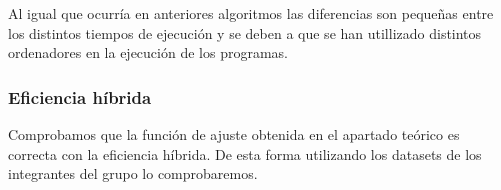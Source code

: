 \documentclass[10pt,a4paper]{article}
\begin{document}
\begin{table}[h!]
	\centering
	\footnotesize
	\hspace{2cm}
	\hspace{2cm}
	\caption{Experiencia empírica de algoritmo de Selección sin optimizar}
\end{table}

Al igual que ocurría en anteriores algoritmos las diferencias son pequeñas entre los distintos tiempos de ejecución y se deben a que se han utillizado distintos ordenadores en la ejecución de los programas.

\subsubsection{Eficiencia híbrida}
Comprobamos que la función de ajuste obtenida en el apartado teórico es correcta con la eficiencia híbrida. De esta forma utilizando los datasets de los integrantes del grupo lo comprobaremos. \\
\end{document}
